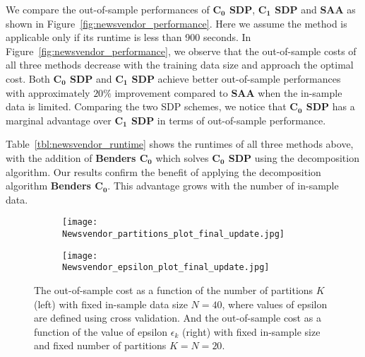 \documentclass{article}
\begin{document}
We compare the out-of-sample performances of \textbf{$\mathbf{C_0}$ SDP}, \textbf{$\mathbf{C_1}$ SDP} and \textbf{SAA} as shown in Figure~\ref{fig:newsvendor_performance}. Here we assume the method is applicable only if its runtime is less than 900 seconds. In Figure~\ref{fig:newsvendor_performance}, we observe that the out-of-sample costs of all three methods decrease with the  training data size and approach the optimal cost. %
Both \textbf{$\mathbf{C_0}$ SDP} and \textbf{$\mathbf{C_1}$ SDP} achieve better out-of-sample performances with approximately $20\%$ improvement compared to \textbf{SAA} when the in-sample data is limited. Comparing the two SDP schemes, we notice that \textbf{$\mathbf{C_0}$ SDP} has a marginal advantage over \textbf{$\mathbf{C_1}$ SDP} in terms of out-of-sample performance.

Table~\ref{tbl:newsvendor_runtime} shows the runtimes of all three methods above, with the addition of \textbf{Benders $\mathbf{C_0}$} which solves \textbf{$\mathbf{C_0}$ SDP} using the decomposition algorithm. Our results confirm the benefit of applying the decomposition algorithm \textbf{Benders $\mathbf{C_0}$}. This advantage grows with the number of in-sample data. 

 	\begin{figure}[t!]
 		\begin{center}
		\begin{subfigure}[b]{.5\textwidth}
			\texttt{[image: Newsvendor\_partitions\_plot\_final\_update.jpg]}
		\end{subfigure}\hfill%
		\begin{subfigure}[b]{.5\textwidth}
			\texttt{[image: Newsvendor\_epsilon\_plot\_final\_update.jpg]}
		\end{subfigure}\hfill%
		\vspace{-3mm}
		\caption{The out-of-sample cost as a function of the number of partitions $K$ (left) with fixed in-sample data size $N = 40$, where values of epsilon are defined using cross validation. And the out-of-sample cost as a function of the value of epsilon $\epsilon_k$ (right) with fixed in-sample size and fixed number of partitions $K = N = 20$.}
		    \label{fig:newsvendor}
 		\end{center}
 	\end{figure}
\end{document}
